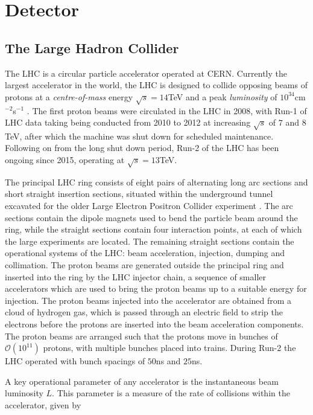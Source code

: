 \chapter{Detector}\label{c:Det}

\section{The Large Hadron Collider}
\label{d:lhc}

	The LHC is a circular particle accelerator operated at CERN. Currently the largest accelerator in the world, the LHC is designed to collide opposing beams of protons at a \textit{centre-of-mass} energy $\sqrt{s}=14$TeV and a peak \textit{luminosity} of $10^{34}$cm$^{-2}$s$^{-1}$ \cite{lhc}. The first proton beams were circulated in the LHC in 2008, with Run-1 of LHC data taking being conducted from 2010 to 2012 at increasing $\sqrt{s}$ of $7$ and $8$TeV, after which the machine was shut down for scheduled maintenance. Following on from the long shut down period, Run-2 of the LHC has been ongoing since 2015, operating at $\sqrt{s}=13$TeV.

	The principal LHC ring consists of eight pairs of alternating long arc sections and short straight insertion sections, situated within the underground tunnel excavated for the older Large Electron Positron Collider experiment \cite{lep1, lep2}. The arc sections contain the dipole magnets used to bend the particle beam around the ring, while the straight sections contain four interaction points, at each of which the large experiments are located. The remaining straight sections contain the operational systems of the LHC: beam acceleration, injection,  dumping and collimation. The proton beams are generated outside the principal ring and inserted into the ring by the LHC injector chain, a sequence of smaller accelerators which are used to bring the proton beams up to a suitable energy for injection. The proton beams injected into the accelerator are obtained from a cloud of hydrogen gas, which is passed through an electric field to strip the electrons before the protons are inserted into the beam acceleration components. The proton beams are arranged such that the protons move in bunches of $\mathcal{O}(10^{11})$ protons, with multiple bunches placed into trains. During Run-2 the LHC operated with bunch spacings of $50$ns and $25$ns.

	A key operational parameter of any accelerator is the instantaneous beam luminosity $L$. This parameter is a measure of the rate of collisions within the accelerator, given by

